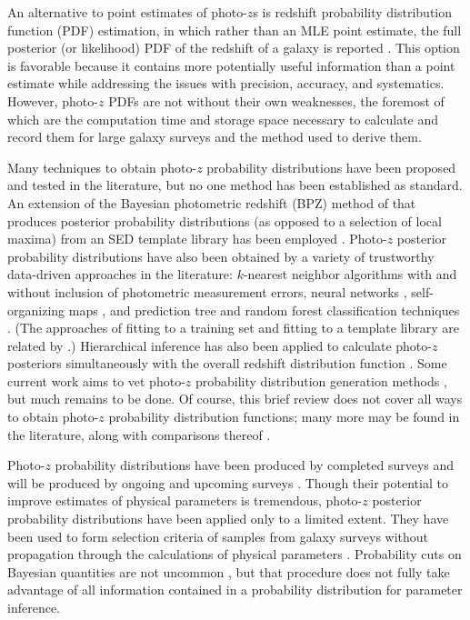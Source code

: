 \documentclass[preprint]{aastex}
\begin{document}
An alternative to point estimates of photo-$z$s is redshift probability 
distribution function (PDF) estimation, in which rather than an MLE point 
estimate, the full posterior (or likelihood) PDF of the redshift of a galaxy is 
reported \citep{Koo1999}.  This option is favorable because it contains more 
potentially useful information than a point estimate while addressing the 
issues with precision, accuracy, and systematics.  However, photo-$z$ PDFs are 
not without their own weaknesses, the foremost of which are the computation 
time and storage space necessary to calculate and record them for large galaxy 
surveys \citep{CarrascoKind2014} and the method used to derive them.

Many techniques to obtain photo-$z$ probability distributions have been 
proposed and tested in the literature, but no one method has been established 
as standard.  An extension of the Bayesian photometric redshift (BPZ) method of 
\citet{Benitez2000} that produces posterior probability distributions (as 
opposed to a selection of local maxima) from an SED template library has been 
employed \citep{Hildebrandt2012, Kelly2014, Lopez-Sanjuan2015}.  Photo-$z$ 
posterior probability distributions have also been obtained by a variety of 
trustworthy data-driven approaches in the literature: $k$-nearest neighbor 
algorithms with \citep{Ball2008} and without \citep{Sheldon2012} inclusion of 
photometric measurement errors, neural networks \citep{Bonnett2015a}, 
self-organizing maps \citep{CarrascoKind2014a}, and prediction tree and random 
forest classification techniques \citep{Carliles2010, CarrascoKind2013}.  (The 
approaches of fitting to a training set and fitting to a template library are 
related by \citet{Budavari2009}.)  Hierarchical inference has also been applied 
to calculate photo-$z$ posteriors simultaneously with the overall redshift 
distribution function \citep{Leistedt2016}.  Some current work aims to vet 
photo-$z$ probability distribution generation methods \citep{Wittman2016}, but 
much remains to be done.  Of course, this brief review does not cover all ways 
to obtain photo-$z$ probability distribution functions; many more may be found 
in the literature, along with comparisons thereof \citep{Hildebrandt2010, 
Dahlen2013, Sanchez2013, Bonnett2015}.

Photo-$z$ probability distributions have been produced by completed surveys 
\citep{Hildebrandt2012, Sheldon2012} and will be produced by ongoing and 
upcoming surveys \citep{LSSTScienceCollaboration2009, CarrascoKind2014a, 
Bonnett2015, Masters2015a}.  Though their potential to improve estimates of 
physical parameters is tremendous, photo-$z$ posterior probability 
distributions have been applied only to a limited extent.  They have been used 
to form selection criteria of samples from galaxy surveys without propagation 
through the calculations of physical parameters 
\citep{VanBreukelen2009,Viironen2015}.  Probability cuts on Bayesian quantities 
are not uncommon \citep{Leung2015, DiPompeo2015a}, but that procedure does not 
fully take advantage of all information contained in a probability distribution 
for parameter inference.  
\end{document}
